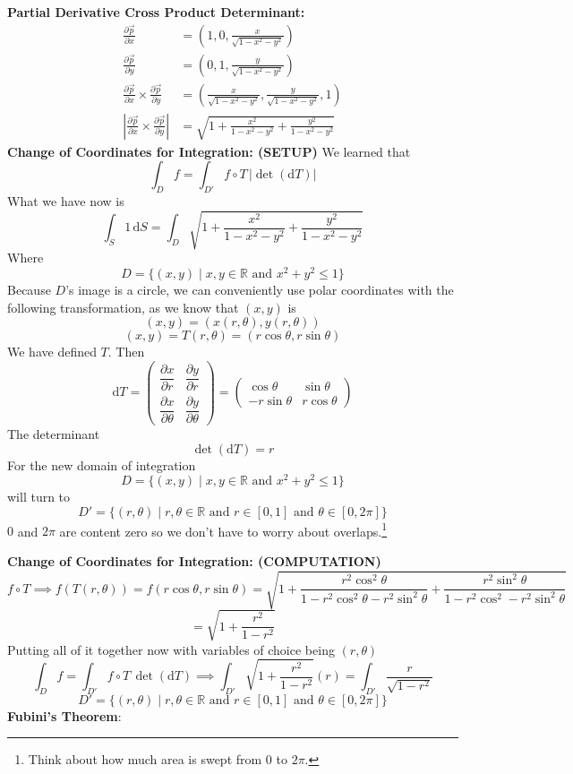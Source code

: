 \documentclass[letter]{article}
\begin{document}
{{\textbf{Partial Derivative Cross Product Determinant: }
\begin{align*}
	\frac{\partial \vec{p}}{\partial x} &= \left(1,0, \frac{x }{\sqrt{1 - x^2 - y^2} }\right) \\
	\frac{\partial \vec{p}}{\partial y} &= \left(0, 1, \frac{y}{\sqrt{1-x^2 -y^2} } \right) \\
	\frac{\partial \vec{p}}{\partial x} \times 
	\frac{\partial \vec{p}}{\partial y} &= 
	\left(\frac{x}{\sqrt{1-x^2-y^2}} , \frac{y}{\sqrt{ 1-x^2-y^2}},1\right)\\
	\left|\frac{\partial \vec{p}}{\partial x} \times  \frac{\partial \vec{p}}{\partial y}\right| &= 
	\sqrt{1 + \frac{x^2}{1-x^2-y^2  } + \frac{y^2}{1-x^2-y^2}} 
\end{align*}
\textbf{Change of Coordinates for Integration: (SETUP)}
We learned that 
\[
\int_{D}^{} f = \int_{D'}^{ } f \circ T \, | \det (\mathrm{d} T) |   
\] 
What we have now is 
\[
	\int_{S}^{} 1 \, \mathrm{d} S = \int_{D}^{}    
	 \sqrt{1 + \frac{x^2}{1-x^2-y^2  } + \frac{y^2}{1-x^2-y^2}} 
\]
Where \[
D = \{(x,y)  \mid  x,y \in \mathbb{R} \text{ and } x^2 + y^2 \le  1\} 
\]
Because $D$'s image is a circle, we can conveniently use polar coordinates with the following transformation, as we know that $(x,y)$ is 
\[
	(x,y) = \left(x(r, \theta), y(r, \theta)\right)
\] 
\[
	(x,y) = T(r, \theta)  = (r \cos \theta , r \sin \theta)
\]
We have defined $T$. Then 
\[
	\mathrm{d} T = \begin{pmatrix} \dfrac{\partial x}{\partial r} & 
	\dfrac{\partial y}{\partial r} \\ 
	\dfrac{\partial x}{\partial \theta} & 
	\dfrac{\partial y}{\partial \theta} 
\end{pmatrix}
	 = \begin{pmatrix} \cos \theta & \sin \theta \\ - r \sin \theta & r \cos \theta \end{pmatrix} 
\] 
The determinant 
\[
\det \left(\mathrm{d} T\right) = 
r
\] 
For the new domain of integration 
\[
D = \{(x,y)  \mid  x,y \in \mathbb{R} \text{ and } x^2 + y^2 \le  1\} 
\]  
will turn to 
\[
	D' = \{(r , \theta)  \mid  r,\theta \in \mathbb{R} \text{ and } r \in [0,1] \text{ and } \theta \in  [0, 2\pi] \} 
\]
$0$ and $2 \pi $ are content zero so we don't have to worry about overlaps.\footnote{Think about how much area is swept from 0 to $2 \pi $.} 

\textbf{Change of Coordinates for Integration: (COMPUTATION)}
\[
f \circ T \implies f(T(r, \theta)) = f(r \cos \theta, r \sin \theta) = 
\sqrt{
1 + \frac{r^2 \cos ^2 \theta}{1 - r^2 \cos ^2 \theta - r^2 \sin ^2 \theta} + \frac{r ^2 \sin ^2 \theta}{1 - r^2 \cos ^2 - r^2 \sin ^2 \theta } }\] \[= \sqrt{1 + \frac{r^2}{1 - r^2}} 
\]
Putting all of it together now with variables of choice being $(r,\theta)$
\[
\int_{D}^{} f = \int_{D'}^{} f \circ T \, \det \left(\mathrm{d} T\right) \implies 
\int_{D'}^{} \sqrt{1 + \frac{r^2}{1 - r^2}} (r)  = \int_{D'}^{} \frac{r}{\sqrt{1 -r^2} }  
\] 
\[
	D' = \{(r , \theta)  \mid  r,\theta \in \mathbb{R} \text{ and } r \in [0,1] \text{ and } \theta \in  [0, 2\pi] \} 
\]
\textbf{Fubini's Theorem}:

}}
\end{document}
